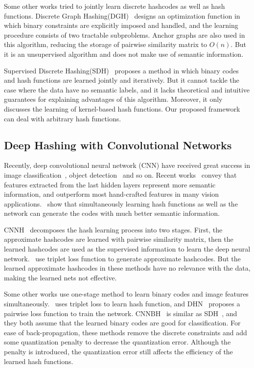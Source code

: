 \documentclass[conference]{IEEEtran}
\begin{document}
Some other works tried to jointly learn discrete hashcodes as well as hash functions. Discrete Graph Hashing(DGH)~\cite{liu2014discrete} designs an optimization function in which binary constraints are explicitly imposed and handled, and the learning procedure consists of two tractable subproblems. Anchor graphs are also used in this algorithm, reducing the storage of pairwise similarity matrix to $O(n)$. But it is an unsupervised algorithm and does not make use of semantic information.

Supervised Discrete Hashing(SDH)~\cite{Shen_2015_CVPR} proposes a method in which binary codes and hash functions are learned jointly and iteratively. But it cannot tackle the case where the data have no semantic labels, and it lacks theoretical and intuitive guarantees for explaining advantages of this algorithm. Moreover, it only discusses the learning of kernel-based hash functions. Our proposed framework can deal with arbitrary hash functions.

\subsection{Deep Hashing with Convolutional Networks}

Recently, deep convolutional neural network (CNN) have received great success in image classification~\cite{krizhevsky2012imagenet,simonyan2014very,he2015deep}, object detection~\cite{ren2015faster} and so on. Recent works~\cite{wan2014deep,schroff2015facenet} convey that features extracted from the last hidden layers represent more semantic information, and outperform most hand-crafted features in many vision applications.~\cite{xia2014supervised,lai2015simultaneous} show that simultaneously learning hash functions as well as the network can generate the codes with much better semantic information.

CNNH~\cite{xia2014supervised} decomposes the hash learning process into two stages. First, the approximate hashcodes are learned with pairwise similarity matrix, then the learned hashcodes are used as the supervised information to learn the deep neural network.~\cite{zhuang2016fast} use triplet loss function to generate approximate hashcodes. But the learned approximate hashcodes in these methods have no relevance with the data, making the learned nets not effective.

Some other works use one-stage method to learn binary codes and image features simultaneously.~\cite{lai2015simultaneous} uses triplet loss to learn hash function, and DHN~\cite{zhu2016deep} proposes a pairwise loss function to train the network. CNNBH~\cite{guo2016hash} is similar as SDH~\cite{Shen_2015_CVPR}, and they both assume that the learned binary codes are good for classification. For ease of back-propagation, these methods remove the discrete constraints and add some quantization penalty to decrease the quantization error. Although the penalty is introduced, the quantization error still affects the efficiency of the learned hash functions.
\end{document}
